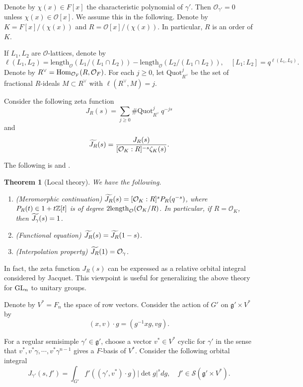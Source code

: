 \documentclass[a4paper]{amsart}
\newcommand{\CO}{{\mathcal {O}}} \newcommand{\CP}{{\mathcal {P}}}
\newcommand{\CS}{{\mathcal {S}}} \newcommand{\CT}{{\mathcal {T}}}
\newcommand{\fg}{{\mathfrak{g}}} \newcommand{\fh}{{\mathfrak{h}}}
\theoremstyle{plain}
\newtheorem{thm}{Theorem}[section] \newtheorem{cor}[thm]{Corollary}
\theoremstyle{remark} \newtheorem{remark}[thm]{Remark}
\theoremstyle{exercise} \newtheorem{exercise}[thm]{Exercise}
\theoremstyle{example} \newtheorem{example}[thm]{Example}
\theoremstyle{question} \newtheorem{question}[thm]{Question}
\theoremstyle{assumption} \newtheorem{assumption}[thm]{Assumption}
\numberwithin{equation}{section}
\newcommand{\Quot}{{\mathrm{Quot}}}
\begin{document}
Denote by $\chi(x) \in F[x]$ the characteristic polynomial of $\gamma'$. Then $\CO_{\gamma'} = 0$ unless $\chi(x) \in \CO[x]$. We assume this in the following. Denote by $K = F[x]/(\chi(x))$ and $R = \CO[x]/(\chi(x))$. In particular, $R$ is an order of $K$.

If $L_1,L_2$ are $\mathcal O$-lattices, denote by
\[\ell(L_1, L_2) = \mathrm{length}_{\mathcal O}(L_1/(L_1 \cap L_2))-\mathrm{length}_{\mathcal O}(L_2/(L_1 \cap L_2)), \quad 
    [L_1:L_2]=q^{\ell(L_1,L_2)}.\]
Denote by $R^\vee={\mathrm{Hom}}_{\mathcal O_F}(R,\mathcal O_F)$. For each $j \geq 0$, let $\Quot_{R^\vee}^j$ be the set of fractional $R$-ideals $M \subset R^\vee$ with $\ell(R^\vee,M) = j$. 

Consider the following zeta function
\[J_R(s) = \sum_{j \geq 0} \# \Quot_{R^\vee}^j \ q^{-js}\]
and
\[\wt{J_R}(s) = \frac{J_R(s)}{[\CO_K:R]^{-s} \zeta_K(s)}.\]


The following is \cite[Theorem 2.5]{Yun13} and \cite[Equation (4.1)]{Yun13}. 
\begin{thm}[Local theory]\label{thm-gl-local} We have the following.
\begin{enumerate}
\item (Meromorphic continuation) 
			$\wt{J_R}(s) = [\CO_K:R]^sP_R(q^{-s})$, where $P_R(t) \in 1 + t{\mathbb {Z}}[t]$ is of degree $2\length_\CO(\CO_K/R)$.
			In particular, if $R = \CO_K$, then $\widetilde{J_\gamma}(s) = 1$.
\item (Functional equation) $\widetilde{J_R}(s) = \widetilde{J_R}(1-s)$.
\item (Interpolation property) $\wt{J_R}(1) = \CO_\gamma$. 
\end{enumerate}
\end{thm}



In fact, the zeta function $J_R(s)$ can be expressed as a relative orbital integral considered by Jacquet. This viewpoint is useful for generalizing the above theory for ${\mathrm{GL}}_n$ to unitary groups.


 Denote by $V^*=F_n$  the space of row vectors. Consider the action of $G'$ on $\fg' \times V^*$ by 
\[(x,v) \cdot g = \left( g^{-1}x g, vg \right).\] 

For a regular semisimple $\gamma' \in \fg'$, choose a vector $v^* \in V^*$ cyclic for $\gamma'$ in the sense that  $v^*,v^*\gamma,\cdots,v^*\gamma^{n-1}$ gives a $F$-basis of $V^*$. Consider the following orbital integral
\[J_{\gamma'}(s,f') = \int_{G'} f'\left( (\gamma',v^*) \cdot g \right) |\det g|^s dg, \quad f' \in \CS(\fg' \times V^*).\]
 
\end{document}
